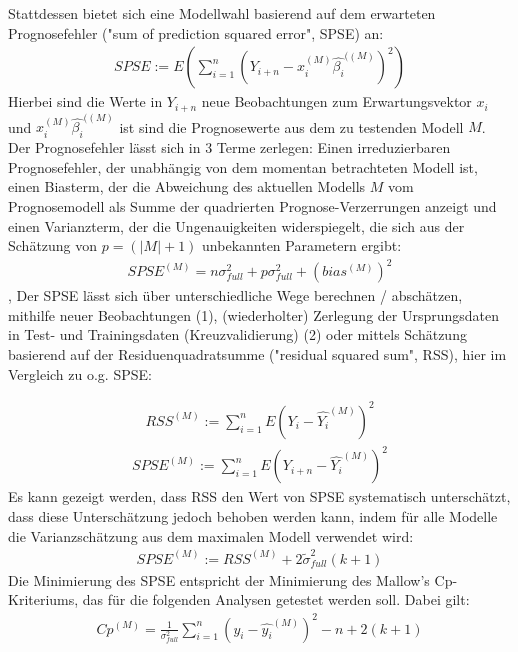 	Stattdessen bietet sich eine Modellwahl basierend auf dem erwarteten Prognosefehler ("sum of prediction squared error", SPSE) an: 
	\begin{align}
		SPSE := E(\sum_{i=1}^{n} (Y_{i+n} - x_{i}^{(M)}\hat{\beta_i}^{((M)})^2)
	\end{align}
	Hierbei sind die Werte in $Y_{i+n}$ neue Beobachtungen zum Erwartungsvektor $x_i$ und $x_{i}^{(M)}\hat{\beta_i}^{((M)}$ ist sind die Prognosewerte aus dem zu testenden Modell $M$. 
	Der Prognosefehler lässt sich in 3 Terme zerlegen: Einen irreduzierbaren Prognosefehler, der unabhängig von dem momentan betrachteten Modell ist, einen Biasterm, der die Abweichung des aktuellen Modells $M$ vom Prognosemodell als Summe der quadrierten Prognose-Verzerrungen anzeigt und einen Varianzterm, der die Ungenauigkeiten widerspiegelt, die sich aus der Schätzung von $p = (|M|+1)$ unbekannten Parametern ergibt:
	\begin{align}
	SPSE^{(M)} = n\sigma_{full}^2 + p\sigma_{full}^2 + (bias^{(M)})^2
	\end{align},
	Der SPSE lässt sich über unterschiedliche Wege berechnen / abschätzen, mithilfe neuer Beobachtungen (1), (wiederholter) Zerlegung der Ursprungsdaten in Test- und Trainingsdaten (Kreuzvalidierung) (2) oder mittels Schätzung basierend auf der Residuenquadratsumme ("residual squared sum", RSS), hier im Vergleich zu o.g. SPSE:

	\begin{align}
	RSS^{(M)} := \sum_{i=1}^{n} E (Y_{i} - \hat{Y_i}^{(M)})^2
	\end{align}
	\begin{align}
	SPSE^{(M)} := \sum_{i=1}^{n} E (Y_{i+n} - \hat{Y_i}^{(M)})^2
	\end{align}
	Es kann gezeigt werden, dass RSS den Wert von SPSE systematisch unterschätzt, dass diese Unterschätzung jedoch behoben werden kann, indem für alle Modelle die Varianzschätzung aus dem maximalen Modell verwendet wird\cite{Schumacher.2019}: 
	\begin{align}
	SPSE^{(M)} := RSS^{(M)} + 2 \tilde{\sigma}_{full} ^2 (k+1)
	\end{align}
	Die Minimierung des SPSE entspricht der Minimierung des Mallow's Cp- Kriteriums, das für die folgenden Analysen getestet werden soll. Dabei gilt:
	\begin{align}
	Cp^{(M)} = \frac{1}{\sigma_{full}^2} \sum_{i=1}^{n} (y_i - \hat{y_i}^{(M)})^2 - n + 2(k+1)
	\end{align}
	
	

